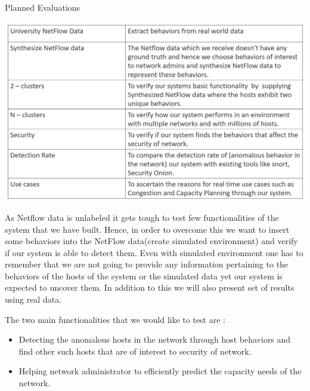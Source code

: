 \begin{table}[b]
		\caption{Planned Evaluations}%
	\centerline{\includegraphics[scale = 0.6]{evaluation.png}}
\end{table}


As Netflow data is unlabeled it gets tough to test few functionalities of the system
that we have built. Hence, in order to overcome this we want to insert some behaviors
into the NetFlow data(create simulated environment) and verify if our system is able to
detect them. Even with simulated environment one has to remember that we are not going
to provide any information pertaining to the behaviors of the hosts of the system or the
simulated data yet our system is expected to uncover them. In addition to this we will also
present set of results using real data.




The two main functionalities that we would like to test are :
\begin{itemize}
	
	\item Detecting the anomalous hosts in the network through host behaviors and find other
	such hosts that are of interest to security of network.
	
	\item Helping network administrator to efficiently predict the capacity needs of the network.
\end{itemize}

